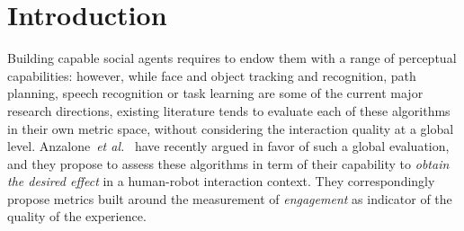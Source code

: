 \documentclass{sig-alternate}
\newcommand{\etal}{\textit{et al.}\xspace}
\begin{document}



\section{Introduction}

%

Building capable social agents requires to endow them with a range of perceptual
capabilities: however, while face and object tracking and recognition, path
planning, speech recognition or task learning are some of the current major
research directions, existing literature tends to evaluate each of these
algorithms in their own metric space, without considering the interaction
quality at a global level. Anzalone~\etal~\cite{anzalone} have recently argued
in favor of such a global evaluation, and they propose to assess these
algorithms in term of their capability to \emph{obtain the desired effect} in a
human-robot interaction context. They correspondingly propose metrics built
around the measurement of \emph{engagement} as indicator of the quality of the
experience.
\end{document}
